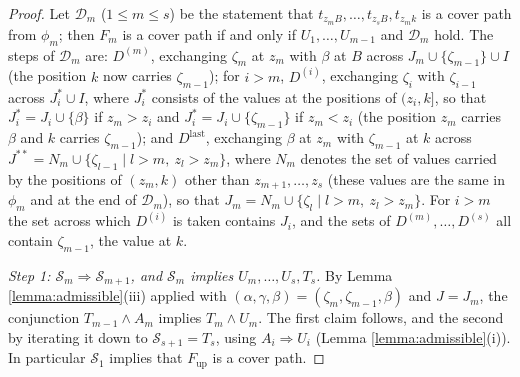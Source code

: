 \documentclass{amsart}
\theoremstyle{definition}
\theoremstyle{remark}
\numberwithin{equation}{section}
\begin{document}
\begin{proof}
Let $\mathcal D_m$ ($1\leq m\leq s$) be the statement that $t_{z_mB},\ldots,t_{z_sB},t_{z_mk}$ is a cover path from $\phi_m$; then $F_m$ is a cover path if and only if $U_1,\ldots,U_{m-1}$ and $\mathcal D_m$ hold. The steps of $\mathcal D_m$ are: $D^{(m)}$, exchanging $\zeta_m$ at $z_m$ with $\beta$ at $B$ across $J_m\cup\{\zeta_{m-1}\}\cup I$ (the position $k$ now carries $\zeta_{m-1}$); for $i>m$, $D^{(i)}$, exchanging $\zeta_i$ with $\zeta_{i-1}$ across $J^\ast_i\cup I$, where $J^\ast_i$ consists of the values at the positions of $(z_i,k]$, so that $J^\ast_i=J_i\cup\{\beta\}$ if $z_m>z_i$ and $J^\ast_i=J_i\cup\{\zeta_{m-1}\}$ if $z_m<z_i$ (the position $z_m$ carries $\beta$ and $k$ carries $\zeta_{m-1}$); and $D^{\mathrm{last}}$, exchanging $\beta$ at $z_m$ with $\zeta_{m-1}$ at $k$ across $J^{\ast\ast}=N_m\cup\{\zeta_{l-1}\mid l>m,\ z_l>z_m\}$, where $N_m$ denotes the set of values carried by the positions of $(z_m,k)$ other than $z_{m+1},\ldots,z_s$ (these values are the same in $\phi_m$ and at the end of $\mathcal D_m$), so that $J_m=N_m\cup\{\zeta_l\mid l>m,\ z_l>z_m\}$. For $i>m$ the set across which $D^{(i)}$ is taken contains $J_i$, and the sets of $D^{(m)},\ldots,D^{(s)}$ all contain $\zeta_{m-1}$, the value at $k$.

\emph{Step 1: $\mathcal S_m\Rightarrow\mathcal S_{m+1}$, and $\mathcal S_m$ implies $U_m,\ldots,U_s,T_s$.} By Lemma \ref{lemma:admissible}(iii) applied with $(\alpha,\gamma,\beta)=(\zeta_m,\zeta_{m-1},\beta)$ and $J=J_m$, the conjunction $T_{m-1}\wedge A_m$ implies $T_m\wedge U_m$. The first claim follows, and the second by iterating it down to $\mathcal S_{s+1}=T_s$, using $A_i\Rightarrow U_i$ (Lemma \ref{lemma:admissible}(i)). In particular $\mathcal S_1$ implies that $F_{\mathrm{up}}$ is a cover path.


\end{proof}
\end{document}
